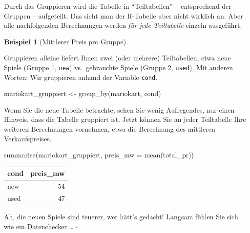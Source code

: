 \documentclass[
  letterpaper,
  twoside,
  open=any]{scrbook}
\newenvironment{Shaded}{\begin{snugshade}}{\end{snugshade}}
\newcommand{\AttributeTok}[1]{\textcolor[rgb]{0.40,0.45,0.13}{#1}}
\newcommand{\FunctionTok}[1]{\textcolor[rgb]{0.28,0.35,0.67}{#1}}
\newcommand{\NormalTok}[1]{\textcolor[rgb]{0.00,0.23,0.31}{#1}}
\newcommand{\OtherTok}[1]{\textcolor[rgb]{0.00,0.23,0.31}{#1}}
\theoremstyle{definition}
\theoremstyle{definition}
\theoremstyle{definition}
\newtheorem{example}{Beispiel}[chapter]
\theoremstyle{remark}
\begin{document}
Durch das Gruppieren wird die Tabelle in \enquote{Teiltabellen} --
entsprechend der Gruppen -- aufgeteilt. Das sieht man der R-Tabelle aber
nicht wirklich an. Aber alle nachfolgenden Berechnungen werden \emph{für
jede Teiltabelle} einzeln ausgeführt.

\begin{example}[Mittlerer Preis pro
Gruppe]\protect\hypertarget{exm-groupby}{}\label{exm-groupby}

Gruppieren alleine liefert Ihnen zwei (oder mehrere) Teiltabellen, etwa
neue Spiele (Gruppe 1, \texttt{new}) vs.~gebrauchte Spiele (Gruppe 2,
\texttt{used}). Mit anderen Worten: Wir gruppieren anhand der Variable
\texttt{cond}.

\begin{Shaded}
\begin{Highlighting}[]
\NormalTok{mariokart\_gruppiert }\OtherTok{\textless{}{-}} \FunctionTok{group\_by}\NormalTok{(mariokart, cond)}
\end{Highlighting}
\end{Shaded}

Wenn Sie die neue Tabelle betrachte, sehen Sie wenig Aufregendes, nur
einen Hinweis, dass die Tabelle gruppiert ist. Jetzt können Sie an jeder
Teiltabelle Ihre weiteren Berechnungen vornehmen, etwa die Berechnung
des mittleren Verkaufspreises.

\begin{Shaded}
\begin{Highlighting}[]
\FunctionTok{summarise}\NormalTok{(mariokart\_gruppiert, }\AttributeTok{preis\_mw =} \FunctionTok{mean}\NormalTok{(total\_pr))}
\end{Highlighting}
\end{Shaded}

\begin{longtable}[]{@{}lr@{}}
\toprule\noalign{}
cond & preis\_mw \\
\midrule\noalign{}
\endhead
\bottomrule\noalign{}
\endlastfoot
new & 54 \\
used & 47 \\
\end{longtable}

Ah, die neuen Spiele sind teuerer, wer hätt's gedacht! Langsam fühlen
Sie sich wie ein Datenchecker \ldots{} \(\square\)

\end{example}
\end{document}
